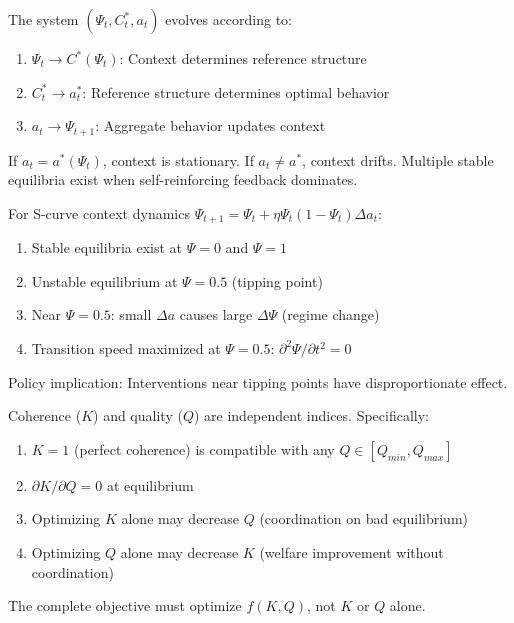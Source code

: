 \begin{theorem}
The system $(\Psi_t, C^*_t, a_t)$ evolves according to:
\begin{enumerate}
\item $\Psi_t \to C^*(\Psi_t)$: Context determines reference structure
\item $C^*_t \to a^*_t$: Reference structure determines optimal behavior
\item $a_t \to \Psi_{t+1}$: Aggregate behavior updates context
\end{enumerate}
If $a_t = a^*(\Psi_t)$, context is stationary. If $a_t \neq a^*$, context drifts.
Multiple stable equilibria exist when self-reinforcing feedback dominates.
\end{theorem}

\begin{theorem}
For S-curve context dynamics $\Psi_{t+1} = \Psi_t + \eta\Psi_t(1-\Psi_t)\Delta a_t$:
\begin{enumerate}
\item Stable equilibria exist at $\Psi = 0$ and $\Psi = 1$
\item Unstable equilibrium at $\Psi = 0.5$ (tipping point)
\item Near $\Psi = 0.5$: small $\Delta a$ causes large $\Delta\Psi$ (regime change)
\item Transition speed maximized at $\Psi = 0.5$: $\partial^2\Psi/\partial t^2 = 0$
\end{enumerate}
Policy implication: Interventions near tipping points have disproportionate effect.
\end{theorem}

\begin{theorem}[MP-T20: K-Q Independence]
Coherence ($K$) and quality ($Q$) are independent indices. Specifically:
\begin{enumerate}
\item $K = 1$ (perfect coherence) is compatible with any $Q \in [Q_{min}, Q_{max}]$
\item $\partial K/\partial Q = 0$ at equilibrium
\item Optimizing $K$ alone may decrease $Q$ (coordination on bad equilibrium)
\item Optimizing $Q$ alone may decrease $K$ (welfare improvement without coordination)
\end{enumerate}
The complete objective must optimize $f(K, Q)$, not $K$ or $Q$ alone.
\end{theorem}

